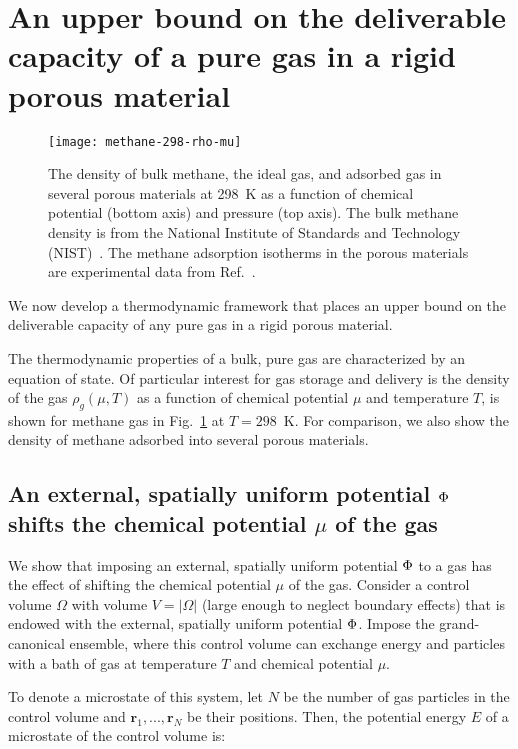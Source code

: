 \section{An upper bound on the deliverable capacity of a pure gas in a rigid porous material}\label{sec:upper-bound}
\begin{figure}
  \centering
  \texttt{[image: methane-298-rho-mu]}
  \caption{The density of bulk methane, the ideal gas, and adsorbed gas in several porous materials at 298\ K as a function of chemical potential (bottom axis) and pressure (top axis). The bulk methane density is from the National Institute of Standards and Technology (NIST)~\cite{nist}. The methane adsorption isotherms in the porous materials are experimental data from Ref.~\cite{mason2014evaluating, furukawa2009storage}.
  }
  \label{fig:density-vs-mu-ch4}
\end{figure}

We now develop a thermodynamic framework that places an upper bound on the deliverable capacity of any pure gas in a rigid porous material.

The thermodynamic properties of a bulk, pure gas are characterized by an
equation of state. Of particular interest for gas storage and delivery is the
density of the gas $\rho_g(\mu,T)$ as a function of chemical potential $\mu$
and temperature $T$, is shown for methane gas in
Fig.~\ref{fig:density-vs-mu-ch4} at $T=298$\ K. For comparison, we also show
the density of methane adsorbed into several porous materials.

\subsection{An external, spatially uniform potential $\Phi$ shifts the chemical potential $\mu$ of the gas} \label{sec:V_shifts_chem_pot}
We show that imposing an external, spatially uniform potential $\Phi$ to a gas
has the effect of shifting the chemical potential $\mu$ of the gas. Consider a control volume $\Omega$ with volume
$V=|\Omega|$ (large enough to neglect boundary effects) that is endowed with
the external, spatially uniform potential $\Phi$. Impose the grand-canonical
ensemble, where this control volume can exchange energy and particles with a
bath of gas at temperature $T$ and chemical potential $\mu$.

To denote a microstate of this system, let $N$ be the number of gas particles
in the control volume and $\mathbf{r}_1,...,\mathbf{r}_N$ be their positions.
Then, the potential energy $E$ of a microstate of the control volume is:

